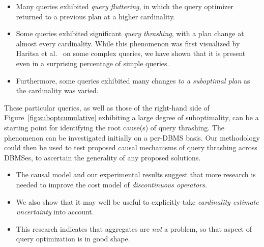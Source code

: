\documentclass[prodmode,acmtods]{acmsmall}
\begin{document}
\begin{itemize}

\item Many queries exhibited {\em query fluttering}, in which the query
  optimizer returned to a previous plan at a higher cardinality.
\item Some queries exhibited significant {\em query thrashing}, with a plan change at
         almost every cardinality. While this phenomenon was first visualized
         by Haritsa et al.~\cite{harish07,Haritsa10} on some complex
         queries, we have shown that it is present even in a surprising
         percentage of simple queries.

\item Furthermore, some queries exhibited many changes
{\em to a suboptimal plan} as the \hbox{cardinality} was varied.
\end{itemize}
\noindent
These particular queries, as well as those of the right-hand side of
Figure~\ref{fig:suboptcumulative} exhibiting a large degree of suboptimality, can be a starting point for identifying the root
cause(s) of query thrashing. The phenomenon can be investigated initially on a
per-DBMS basis. Our methodology could then be
used to test proposed causal mechanisms of query thrashing across \hbox{DBMSes}, to
ascertain the generality of any proposed solutions.

\begin{itemize}
\item The causal model and our experimental results suggest that more
research is needed to improve the cost model of {\em discontinuous
operators}.

\item We also show that it may well be useful to explicitly take {\em \hbox{cardinality} estimate
  uncertainty} into account.

\item This research indicates that aggregates are {\em not} a problem, so
  that aspect of query optimization is in good shape.

\end{itemize}
\end{document}
